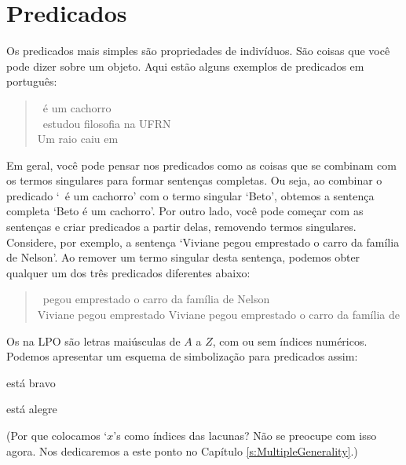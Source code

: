 \section{Predicados}
Os predicados mais simples são propriedades de indivíduos.
São coisas que você pode dizer sobre um objeto.
Aqui estão alguns exemplos de predicados em português:
	\begin{quote}
		\blank\ é um cachorro\\
		\blank\ estudou filosofia na UFRN\\
		Um raio caiu em \blank
	\end{quote}
Em geral, você pode pensar nos predicados como as coisas que se combinam com os termos singulares para formar sentenças completas.
Ou seja, ao combinar o predicado `\blank\ é um cachorro' com o termo singular `Beto', obtemos a sentença completa `Beto é um cachorro'.
Por outro lado, você pode começar com as sentenças e criar predicados a partir delas, removendo termos singulares.
Considere, por exemplo, a sentença `Viviane pegou emprestado o carro da família de Nelson'.
Ao remover um termo singular desta sentença, podemos obter qualquer um dos três predicados diferentes abaixo:
	\begin{quote}
		\blank\ pegou emprestado o carro da família de Nelson\\
		Viviane pegou emprestado \blank
		Viviane pegou emprestado o carro da família de \blank
	\end{quote}
Os  na LPO são letras maiúsculas de $A$ a $Z$, com ou sem índices numéricos.
Podemos apresentar um esquema de simbolização para predicados assim:
	\begin{ekey}
		\item[\atom{B}{x}]  está bravo
		\item[\atom{A}{x}]  está alegre
	\end{ekey}
       (Por que colocamos `$x$'s como índices das lacunas? Não se preocupe com isso agora.
       Nos dedicaremos a este ponto no Capítulo \ref{s:MultipleGenerality}.)


